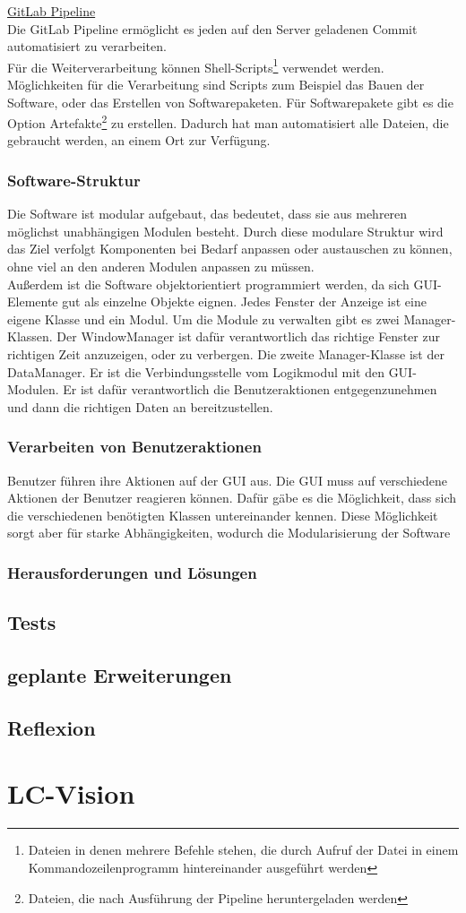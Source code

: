 \documentclass[a4paper,12pt,top=2.5cm,bottom=2.5cm, left=2.5cm, right=2.5cm, numbers=noenddot]{scrartcl}
\begin{document}
\underline{GitLab Pipeline}\\
Die GitLab Pipeline ermöglicht es jeden auf den Server geladenen Commit automatisiert zu verarbeiten. \\
Für die Weiterverarbeitung können Shell-Scripts\footnote{Dateien in denen mehrere Befehle stehen, die durch Aufruf der Datei in einem Kommandozeilenprogramm hintereinander ausgeführt werden} verwendet werden. \\Möglichkeiten für die Verarbeitung sind Scripts zum Beispiel das Bauen der Software, oder das Erstellen von Softwarepaketen. Für Softwarepakete gibt es die Option Artefakte\footnote{Dateien, die nach Ausführung der Pipeline heruntergeladen werden} zu erstellen. Dadurch hat man automatisiert alle Dateien, die gebraucht werden, an einem Ort zur Verfügung.
\subsubsection{Software-Struktur}
Die Software ist modular aufgebaut, das bedeutet, dass sie aus mehreren möglichst unabhängigen Modulen besteht. Durch diese modulare Struktur wird das Ziel verfolgt Komponenten bei Bedarf anpassen oder austauschen zu können, ohne viel an den anderen Modulen anpassen zu müssen. \\
Außerdem ist die Software objektorientiert programmiert werden, da sich GUI-Elemente gut als einzelne Objekte eignen. Jedes Fenster der Anzeige ist eine eigene Klasse und ein Modul. Um die Module zu verwalten gibt es zwei Manager-Klassen. Der WindowManager ist dafür verantwortlich das richtige Fenster zur richtigen Zeit anzuzeigen, oder zu verbergen. Die zweite Manager-Klasse ist der DataManager. Er ist die Verbindungsstelle vom Logikmodul mit den GUI-Modulen. Er ist dafür verantwortlich die Benutzeraktionen entgegenzunehmen und dann die richtigen Daten an bereitzustellen. 

\subsubsection{Verarbeiten von Benutzeraktionen}
Benutzer führen ihre Aktionen auf der GUI aus. Die GUI muss auf verschiedene Aktionen der Benutzer reagieren können. Dafür gäbe es die Möglichkeit, dass sich die verschiedenen benötigten Klassen untereinander kennen. Diese Möglichkeit sorgt aber für starke Abhängigkeiten, wodurch die Modularisierung der Software 
\subsubsection{Herausforderungen und Lösungen}
\subsection{Tests}
\subsection{geplante Erweiterungen}
\subsection{Reflexion}

\section{LC-Vision}
\newpage
\printbibliography
\end{document}
